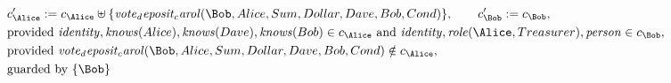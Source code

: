 \begin{align*}
&
c'_
{
\Alice
}
 := 
c_
{
\Alice
}
 \uplus 
\{
\mathit{
vote_deposit_carol
}
(
\Bob
,
Alice
,
Sum
,
Dollar
,
Dave
,
Bob
,
Cond
)
\}
, \qquad 
c'_
{
\Bob
}
 := 
c_
{
\Bob
}
,\\
&
\text{provided } 
\mathit{
identity
}
,
\mathit{
knows
}
(
Alice
)
,
\mathit{
knows
}
(
Dave
)
,
\mathit{
knows
}
(
Bob
)
 \in c_
{
\Alice
}
 \text{ and } 
\mathit{
identity
}
,
\mathit{
role
}
(
\Alice
,
Treasurer
)
,
\mathit{
person
}
 \in c_
{
\Bob
}
,\\
&
\text{provided } 
\mathit{
vote_deposit_carol
}
(
\Bob
,
Alice
,
Sum
,
Dollar
,
Dave
,
Bob
,
Cond
)
 \notin c_
{
\Alice
}
,\\
&
\text{guarded by } \{
\Bob
\}
\end{align*}

